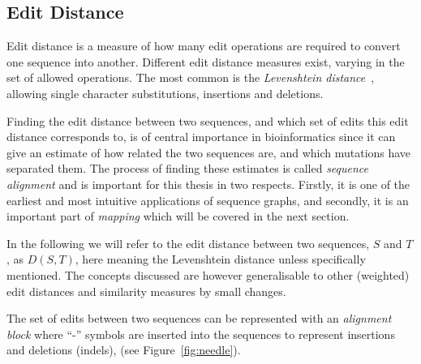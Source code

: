 \subsection{Edit Distance}
Edit distance is a measure of how many edit operations are required to convert one sequence into another.
Different edit distance measures exist, varying in the set of allowed operations.
The most common is the \emph{Levenshtein distance}~\cite{levenshtein}, allowing single character substitutions, insertions and deletions. 

Finding the edit distance between two sequences, and which set of edits this edit distance corresponds to, is of central importance in bioinformatics since it can give an estimate of how related the two sequences are, and which mutations have separated them.
The process of finding these estimates is called \emph{sequence alignment} and is important for this thesis in two respects.
Firstly, it is one of the earliest and most intuitive applications of sequence graphs, and secondly, it is an important part of \emph{mapping} which will be covered in the next section. 

In the following we will refer to the edit distance between two sequences, $S$ and $T$, as $D(S, T)$, here meaning the Levenshtein distance unless specifically mentioned.
The concepts discussed are however generalisable to other (weighted) edit distances and similarity measures by small changes.

The set of edits between two sequences can be represented with an \emph{alignment block} where ``-'' symbols are inserted into the sequences to represent insertions and deletions (indels), (see Figure~\ref{fig:needle}).

